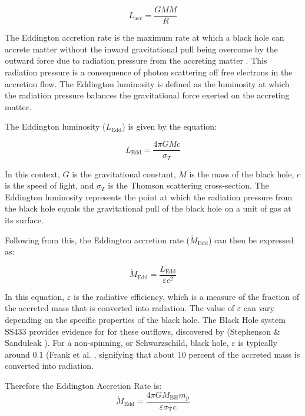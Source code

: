 \documentclass[journal,article,submit,pdftex,moreauthors]{Definitions/mdpi}
\begin{document}
\begin{equation}
    L_{\mathrm{acc}}=\frac{G M \dot{M}}{R}
\end{equation}

The Eddington accretion rate is the maximum rate at which a black hole can accrete matter without the inward gravitational pull being overcome by the outward force due to radiation pressure from the accreting matter \cite{Armitage_2004}. This radiation pressure is a consequence of photon scattering off free electrons in the accretion flow. The Eddington luminosity is defined as the luminosity at which the radiation pressure balances the gravitational force exerted on the accreting matter.

The Eddington luminosity ($L_{\text{Edd}}$) is given by the equation:

\begin{equation}
L_{\text{Edd}} = \frac{4 \pi G M c}{\sigma_T}
\end{equation}

In this context, $G$ is the gravitational constant, $M$ is the mass of the black hole, $c$ is the speed of light, and $\sigma_T$ is the Thomson scattering cross-section. The Eddington luminosity represents the point at which the radiation pressure from the black hole equals the gravitational pull of the black hole on a unit of gas at its surface.

Following from this, the Eddington accretion rate ($\dot{M}_{\text{Edd}}$) can then be expressed as:

\begin{equation}
\dot{M}{_\text{Edd}} = \frac{L{_\text{Edd}}}{\varepsilon c^2}
\end{equation}

In this equation, $\varepsilon$ is the radiative efficiency, which is a measure of the fraction of the accreted mass that is converted into radiation. The value of $\varepsilon$ can vary depending on the specific properties of the black hole. The Black Hole system SS433 provides evidence for for these outflows, discovered by (Stephenson \& Sanduleak \cite{Stephenson_Sanduleak_1977}). For a non-spinning, or Schwarzschild, black hole, $\varepsilon$ is typically around 0.1 (Frank et al. \cite{Frank_King_Raine_2002}, signifying that about 10 percent of the accreted mass is converted into radiation.

Therefore the Eddington Accretion Rate is: 
\begin{equation}
    \dot{M}_{\mathrm{Edd}}=\frac{4 \pi G M_{\mathrm{BH}} m_{\mathrm{p}}}{\varepsilon \sigma_{\mathrm{T}} c}
\end{equation}
\end{document}
